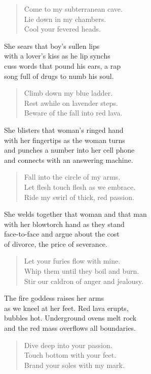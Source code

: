 \documentclass[twoside,10pt]{book}
\begin{document}
\begin{quote}
Come to my subterranean cave.\\
Lie down in my chambers.\\
Cool your fevered heads.
\end{quote}

She sears that boy's sullen lips\\
with a lover's kiss as he lip synchs\\
cuss words that pound his ears, a rap\\
song full of drugs to numb his soul.

\begin{quote}
Climb down my blue ladder.\\
Rest awhile on lavender steps.\\
Beware of the fall into red lava.
\end{quote}

She blisters that woman's ringed hand\\
with her fingertips as the woman turns\\
and punches a number into her cell phone\\
and connects with an answering machine.

\begin{quote}
Fall into the circle of my arms.\\
Let flesh touch flesh as we embrace.\\
Ride my swirl of thick, red passion.
\end{quote}

She welds together that woman and that man\\
with her blowtorch hand as they stand\\
face-to-face and argue about the cost\\
of divorce, the price of severance.

\begin{quote}
Let your furies flow with mine.\\
Whip them until they boil and burn.\\
Stir our caldron of anger and jealousy.
\end{quote}

The fire goddess raises her arms\\
as we kneel at her feet. Red lava erupts,\\
bubbles hot. Underground ovens melt rock\\
and the red mass overflows all boundaries.

\begin{quote}
Dive deep into your passion.\\
Touch bottom with your feet.\\
Brand your soles with my mark.
\end{quote}
\end{document}

